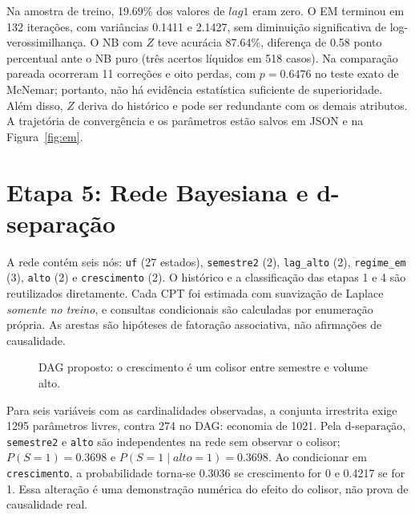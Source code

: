 \documentclass[12pt,a4paper]{article}
\begin{document}
Na amostra de treino, 19.69\% dos valores de $lag1$ eram zero. O EM terminou em 132 iterações, com variâncias 0.1411 e 2.1427, sem diminuição significativa de log-verossimilhança. O NB com $Z$ teve acurácia 87.64\%, diferença de 0.58 ponto percentual ante o NB puro (três acertos líquidos em 518 casos). Na comparação pareada ocorreram 11 correções e oito perdas, com $p=0.6476$ no teste exato de McNemar; portanto, não há evidência estatística suficiente de superioridade. Além disso, $Z$ deriva do histórico e pode ser redundante com os demais atributos. A trajetória de convergência e os parâmetros estão salvos em JSON e na Figura~\ref{fig:em}.

\section{Etapa 5: Rede Bayesiana e d-separação}
A rede contém seis nós: \texttt{uf} (27 estados), \texttt{semestre2} (2), \texttt{lag\_alto} (2), \texttt{regime\_em} (3), \texttt{alto} (2) e \texttt{crescimento} (2). O histórico e a classificação das etapas 1 e 4 são reutilizados diretamente. Cada CPT foi estimada com suavização de Laplace \emph{somente no treino}, e consultas condicionais são calculadas por enumeração própria. As arestas são hipóteses de fatoração associativa, não afirmações de causalidade.

\begin{figure}[H]\centering
{}
\caption{DAG proposto: o crescimento é um colisor entre semestre e volume alto.}\label{fig:dag}
\end{figure}

Para seis variáveis com as cardinalidades observadas, a conjunta irrestrita exige 1295 parâmetros livres, contra 274 no DAG: economia de 1021. Pela d-separação, \texttt{semestre2} e \texttt{alto} são independentes na rede sem observar o colisor; $P(S=1)=0.3698$ e $P(S=1\mid alto=1)=0.3698$. Ao condicionar em \texttt{crescimento}, a probabilidade torna-se 0.3036 se crescimento for 0 e 0.4217 se for 1. Essa alteração é uma demonstração numérica do efeito do colisor, não prova de causalidade real.
\end{document}

